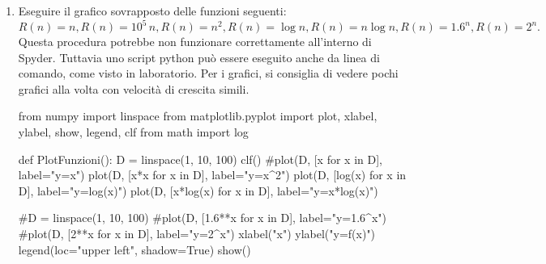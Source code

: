 \documentclass[11pt,a4]{article}
\begin{document}
\begin{enumerate}
\item Eseguire il grafico sovrapposto delle funzioni seguenti: 
$$R(n)=n, R(n)=10^5\,n, R(n)=n^2, R(n)=\log{n}, R(n)=n\log{n}, R(n)=1.6^n, R(n)=2^n.$$
 Questa procedura potrebbe non funzionare correttamente all'interno di Spyder.
Tuttavia uno script python può essere eseguito anche da linea di comando, come visto in laboratorio.
Per i grafici, si consiglia di vedere pochi grafici alla volta con velocità di crescita simili.

\begin{python}
from numpy import linspace
from matplotlib.pyplot import plot, xlabel, ylabel, show, legend, clf
from math import log
    
def PlotFunzioni():   
    D = linspace(1, 10, 100)
    clf()
    #plot(D, [x for x in D], label="y=x")
    plot(D, [x*x for x in D], label="y=x^2")
    plot(D, [log(x) for x in D], label="y=log(x)")
    plot(D, [x*log(x) for x in D], label="y=x*log(x)")
    
    #D = linspace(1, 10, 100)
    #plot(D, [1.6**x for x in D], label="y=1.6^x")
    #plot(D, [2**x for x in D], label="y=2^x")
    xlabel("x")
    ylabel("y=f(x)")
    legend(loc="upper left", shadow=True)
    show()
\end{python}


\end{enumerate}
\end{document}
